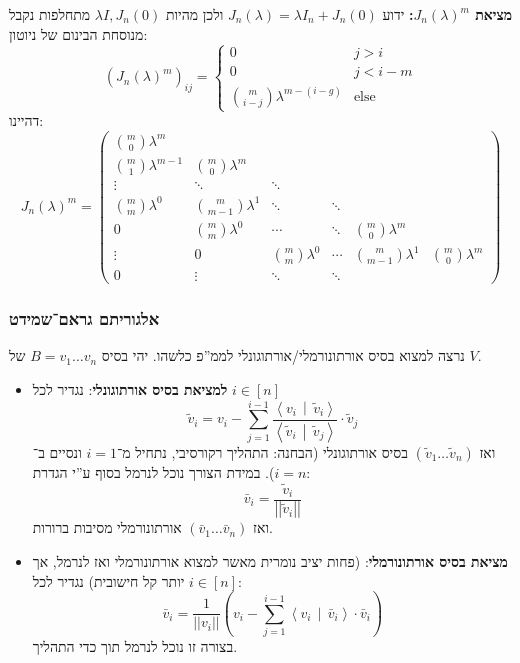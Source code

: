 \documentclass[a4paper]{article}
\newcommand\other {\text{else}}
\newcommand\ra    {\rangle}
\newcommand\la    {\langle}
\newcommand\pms[1]    {\begin{pmatrix}
		#1
\end{pmatrix}}
\newcommand\norm[1]   {\left \vert \left \vert #1 \right \vert \right \vert}
\newcommand\mut [2]   {\left \la #1 \,\middle\vert\, #2 \right \ra}
\renewcommand\lg      {\lambda}
\newcommand\tl    {\tilde}
\newcommand\cl [1]    {\left ( #1 \right )}
\theoremstyle{definition}
\begin{document}
	\textbf{מציאת $J_n(\lg)^{m}$: }ידוע $J_n(\lg) = \lg I_n + J_n(0)$ ולכן מהיות $\lg I, J_n(0)$ מתחלפות נקבל מנוסחת הבינום של ניוטון: 
	\[ (J_n(\lg)^{m})_{ij} = \begin{cases}
		0 & j > i \\ 0 & j < i - m \\ \binom{m}{i - j}\lg^{m - (i - g)} & \other
	\end{cases} \]
	דהיינו: 
	\[ J_n(\lg)^{m} = \pms{
		\binom{m}{0}\lg^{m} \\ 
		\binom{m}{1}\lg^{m - 1} & \binom{m}{0}\lg^{m} \\
		\vdots & \ddots & \ddots \\
		\binom{m}{m}\lg^{0} & \binom{m}{m - 1}\lg^{1} &\ddots& \ddots \\
		0 & \binom{m}{m}\lg^{0} &\cdots&\ddots& \binom{m}{0}\lg^{m} \\
		\vdots & 0 & \binom{m}{m}\lg^{0} &\cdots& \binom{m}{m - 1}\lg^{1} & \binom{m}{0}\lg^{m} \\
		0 & \vdots & \ddots & \ddots
	} \]
	\subsubsection{אלגוריתם גראם־שמידט}
	נרצה למצוא בסיס אורתונורמלי/אורתוגונלי לממ''פ כלשהו. יהי בסיס $B = v_1 \dots v_n$ של $V$. 
	\begin{itemize}
		\item \textbf{למציאת בסיס אורתוגונלי}: נגדיר לכל $i \in [n]$
		\[ \tl v_i = v_i - \sum_{j = 1}^{i - 1}\frac{\mut{v_i}{\tl v_i}}{\mut{\tl v_i}{\tl v_j}} \cdot \tl v_j \]
		ואז $(\tl v_1 \dots \tl v_n)$ בסיס אורתוגונלי (הבחנה: התהליך רקורסיבי, נתחיל מ־$i = 1$ ונסיים ב־$i = n$). במידת הצורך נוכל לנרמל בסוף ע''י הגדרת: 
		\[ \bar v_i = \frac{\tl v_i}{\norm{\tl v_i}} \]
		ואז $(\bar v_1 \dots \bar v_n)$ אורתונורמלי מסיבות ברורות. 
		\item \textbf{מציאת בסיס אורתונורמלי}: (פחות יציב נומרית מאשר למצוא אורתונורמלי ואז לנרמל, אך יותר קל חישובית) נגדיר לכל $i \in [n]$: 
		\[ \bar v_i = \frac{1}{\norm{v_i}} \cl{v_i - \sum_{j = 1}^{i - 1}\mut{v_i}{\bar v_i} \cdot \bar v_i} \]
		בצורה זו נוכל לנרמל תוך כדי התהליך. 
	\end{itemize}
\end{document}
